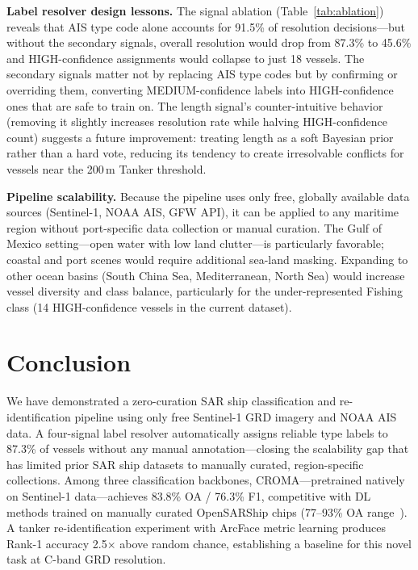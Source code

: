 \documentclass[journal]{IEEEtran}
\begin{document}
\textbf{Label resolver design lessons.}
The signal ablation (Table~\ref{tab:ablation}) reveals that AIS type code
alone accounts for 91.5\% of resolution decisions---but without the
secondary signals, overall resolution would drop from 87.3\% to 45.6\%
and HIGH-confidence assignments would collapse to just 18 vessels.
The secondary signals matter not by replacing AIS type codes but by
confirming or overriding them, converting MEDIUM-confidence labels into
HIGH-confidence ones that are safe to train on.
The length signal's counter-intuitive behavior (removing it slightly
increases resolution rate while halving HIGH-confidence count) suggests
a future improvement: treating length as a soft Bayesian prior rather
than a hard vote, reducing its tendency to create irresolvable conflicts
for vessels near the 200\,m Tanker threshold.

\textbf{Pipeline scalability.}
Because the pipeline uses only free, globally available data sources
(Sentinel-1, NOAA AIS, GFW API), it can be applied to any maritime
region without port-specific data collection or manual curation.
The Gulf of Mexico setting---open water with low land clutter---is
particularly favorable; coastal and port scenes would require additional
sea-land masking.
Expanding to other ocean basins (South China Sea, Mediterranean,
North Sea) would increase vessel diversity and class balance,
particularly for the under-represented Fishing class (14 HIGH-confidence
vessels in the current dataset).

\section{Conclusion}

We have demonstrated a zero-curation SAR ship classification and
re-identification pipeline using only free Sentinel-1 GRD imagery and
NOAA AIS data.
A four-signal label resolver automatically assigns reliable type labels
to 87.3\% of vessels without any manual annotation---closing the
scalability gap that has limited prior SAR ship datasets to manually
curated, region-specific collections.
Among three classification backbones, CROMA---pretrained natively on
Sentinel-1 data---achieves 83.8\% OA / 76.3\% F1, competitive with
DL methods trained on manually curated OpenSARShip chips (77--93\% OA
range~\cite{slesinski2025}).
A tanker re-identification experiment with ArcFace metric learning
produces Rank-1 accuracy 2.5$\times$ above random chance, establishing
a baseline for this novel task at C-band GRD resolution.
\end{document}

